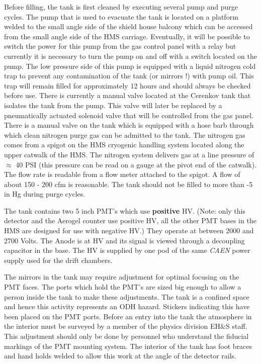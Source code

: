 Before filling, the tank is first cleaned by executing several pump
and purge cycles. The pump that is used to evacuate the tank is located on a
platform welded to the small angle side of the shield house balcony
which can be accessed from the small angle side of the HMS carriage.
Eventually, it will be possible to switch the power for this pump
from the gas control panel with a relay but currently it
is necessary to turn the pump on and off with a switch located on the pump.
The low pressure side of this pump is equipped with a liquid nitrogen
cold trap to prevent any contamination of the tank (or mirrors !)
with pump oil. This trap will remain filled for approximately
12 hours and should always be checked before use. There is currently
a manual valve located at the Cerenkov tank that isolates the tank from
the pump.  This valve will later be replaced by a pneumatically actuated
solenoid valve that will be controlled from the gas panel.
There is a manual valve on the tank which is equipped with a hose
barb through which clean nitrogen purge gas can be admitted to the tank.
The nitrogen gas comes from a spigot on the HMS cryogenic handling system
located along the upper catwalk of the HMS. The nitrogen system
delivers gas at a line pressure of $\approx$ 40 PSI (this pressure can
be read on a gauge at the pivot end of the catwalk). The flow
rate is readable from a flow meter attached to the spigot. A flow of
about 150 - 200 cfm is reasonable. The tank should not be filled to
more than -5 in Hg during purge cycles.

The tank contains two 5 inch PMT's which use {\bf positive} HV.
(Note: only this detector and the Aerogel counter use positive HV, all the other PMT bases in the HMS are designed for use with
negative HV.) They operate
at between 2000 and 2700 Volts. The Anode is at HV and its signal is
viewed through a decoupling capacitor in the base. The HV is supplied
by one pod of the same {\em CAEN} power supply used for the drift chambers.

The mirrors in the tank may require adjustment for optimal focusing
on the PMT faces. The ports which hold the PMT's are sized big enough to allow
a person inside the tank to make these adjustments. The tank is a confined
space and hence this activity represents an ODH hazard. Stickers indicating
this have been placed on the PMT ports. Before an entry into the tank the
atmosphere in the interior must be surveyed by a member of the physics
division EH$\&$S staff.
This adjustment should only
be done by personnel who understand the fiducial markings of the PMT
mounting system. The interior of the tank has foot braces and hand holds welded
to allow this work at the angle of the detector rails.

